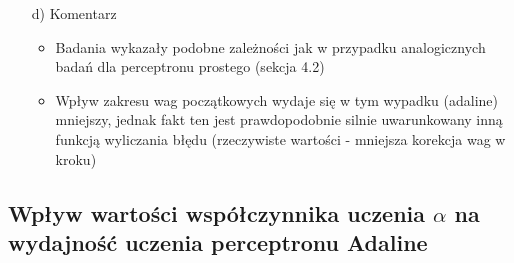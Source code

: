 \documentclass[17pt]{article}
\begin{document}
\begin{enumerate}
\item[d)] Komentarz

\begin{itemize}
\item Badania wykazały podobne zależności jak w przypadku analogicznych badań dla perceptronu prostego (sekcja 4.2)
\item Wpływ zakresu wag początkowych wydaje się w tym wypadku (adaline) mniejszy, jednak fakt ten jest prawdopodobnie silnie uwarunkowany inną funkcją wyliczania błędu (rzeczywiste wartości - mniejsza korekcja wag w kroku)
\end{itemize}

\end{enumerate}

\subsection{Wpływ wartości współczynnika uczenia $\alpha$ na wydajność uczenia perceptronu Adaline}
\vspace{4mm}
\end{document}
